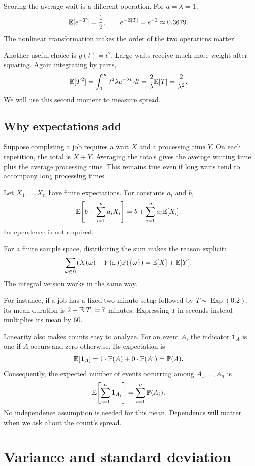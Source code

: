 Scoring the average wait is a different operation. For \(a=\lambda=1\),
\[
  \mathbb{E}[e^{-T}]=\frac12,
  \qquad
  e^{-\mathbb{E}[T]}=e^{-1}\approx0.3679.
\]
The nonlinear transformation makes the order of the two operations matter.

Another useful choice is \(g(t)=t^2\). Large waits receive much more weight
after squaring. Again integrating by parts,
\[
  \mathbb{E}[T^2]
  =\int_0^\infty t^2\lambda e^{-\lambda t}\,dt
  =\frac2\lambda\mathbb{E}[T]
  =\frac2{\lambda^2}.
\]
We will use this second moment to measure spread.

\subsection{Why expectations add}

Suppose completing a job requires a wait \(X\) and a processing time \(Y\).
On each repetition, the total is \(X+Y\). Averaging the totals gives the
average waiting time plus the average processing time. This remains true
even if long waits tend to accompany long processing times.

\begin{theorem}
Let \(X_1,\ldots,X_n\) have finite expectations.
For constants \(a_i\) and \(b\),
\[
  \mathbb{E}\!\left[b+\sum_{i=1}^n a_iX_i\right]
  =b+\sum_{i=1}^n a_i\mathbb{E}[X_i].
\]
Independence is not required.
\end{theorem}

For a finite sample space, distributing the sum makes the reason explicit:
\[
  \sum_{\omega\in\Omega}
    (X(\omega)+Y(\omega))\mathbb{P}(\{\omega\})
  =\mathbb{E}[X]+\mathbb{E}[Y].
\]
The integral version works in the same way.

For instance, if a job has a fixed two-minute setup followed by
\(T\sim\operatorname{Exp}(0.2)\), its mean duration is
\(2+\mathbb{E}[T]=7\) minutes. Expressing \(T\) in seconds instead multiplies
its mean by \(60\).

Linearity also makes counts easy to analyze. For an event \(A\),
the indicator \(\mathbf1_A\) is one if \(A\) occurs and zero otherwise.
Its expectation is
\[
  \mathbb{E}[\mathbf1_A]=1\cdot\mathbb{P}(A)+0\cdot\mathbb{P}(A^c)=\mathbb{P}(A).
\]
Consequently, the expected number of events occurring among
\(A_1,\ldots,A_n\) is
\[
  \mathbb{E}\!\left[\sum_{i=1}^n\mathbf1_{A_i}\right]
  =\sum_{i=1}^n\mathbb{P}(A_i).
\]
No independence assumption is needed for this mean. Dependence will matter
when we ask about the count's spread.

\section{Variance and standard deviation}
\label{sec:variance}

